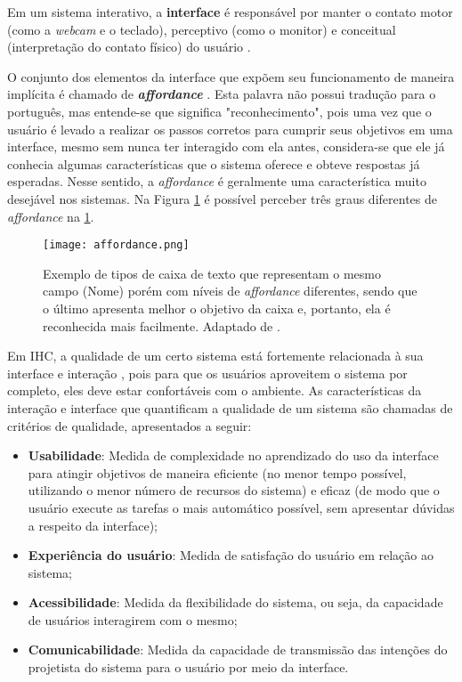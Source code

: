 \indent Em um sistema interativo, a \textbf{interface} é responsável por manter o contato motor (como a \textit{webcam} e o teclado), perceptivo (como o monitor) e conceitual (interpretação do contato físico) do usuário \cite{IHCbook}. 

\indent O conjunto dos elementos da interface que expõem seu funcionamento de maneira implícita é chamado de \textbf{\textit{affordance}} \cite{IHCbook}. Esta palavra não possui tradução para o português, mas entende-se que significa "reconhecimento", pois uma vez que o usuário é levado a realizar os passos corretos para cumprir seus objetivos em uma interface, mesmo sem nunca ter interagido com ela antes, considera-se que ele já conhecia algumas características que o sistema oferece e obteve respostas já esperadas. Nesse sentido, a \textit{affordance} é geralmente uma característica muito desejável nos sistemas. Na Figura \ref{fig:Affordance} é possível perceber três graus diferentes de \textit{affordance} na \ref{fig:Affordance}.

\begin{figure}[!h]
    \centering
    \texttt{[image: affordance.png]}
    \caption{Exemplo de tipos de caixa de texto que representam o mesmo campo (Nome) porém com níveis de \textit{affordance} diferentes, sendo que o último apresenta melhor o objetivo da caixa e, portanto, ela é reconhecida mais facilmente. Adaptado de \cite{affordance}.}
    \label{fig:Affordance}
\end{figure} 

\indent Em IHC, a qualidade de um certo sistema está fortemente relacionada à sua interface e interação \cite{IHCbook}, pois para que os usuários aproveitem o sistema por completo, eles deve estar confortáveis com o ambiente. As características da interação e interface que quantificam a qualidade de um sistema são chamadas de critérios de qualidade, apresentados a seguir:
\begin{itemize}
\item[1] \textbf{Usabilidade}: Medida de complexidade no aprendizado do uso da interface para atingir objetivos de maneira eficiente (no menor tempo possível, utilizando o menor número de recursos do sistema) e eficaz (de modo que o usuário execute as tarefas o mais automático possível, sem apresentar dúvidas a respeito da interface);
\item[2] \textbf{Experiência do usuário}: Medida de satisfação do usuário em relação ao sistema;
\item[3] \textbf{Acessibilidade}: Medida da flexibilidade do sistema, ou seja, da capacidade de usuários interagirem com o mesmo;
\item[4] \textbf{Comunicabilidade}: Medida da capacidade de transmissão das intenções do projetista do sistema para o usuário por meio da interface. %
\end{itemize}

